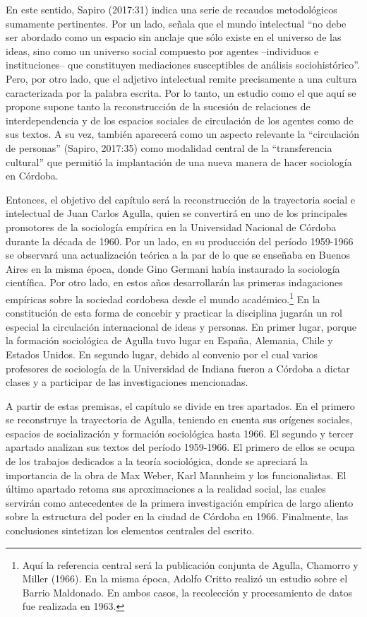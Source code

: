 En este sentido, Sapiro (2017:31) indica una serie de recaudos metodológicos sumamente pertinentes. Por un lado, señala que el mundo intelectual ``no debe ser abordado como un espacio sin anclaje que sólo existe en el universo de las ideas, sino como un universo social compuesto por agentes --individuos e instituciones-- que constituyen mediaciones susceptibles de análisis sociohistórico''. Pero, por otro lado, que el adjetivo intelectual remite precisamente a una cultura caracterizada por la palabra escrita. Por lo tanto, un estudio como el que aquí se propone supone tanto la reconstrucción de la sucesión de relaciones de interdependencia y de los espacios sociales de circulación de los agentes como de sus textos. A su vez, también aparecerá como un aspecto relevante la ``circulación de personas'' (Sapiro, 2017:35) como modalidad central de la ``transferencia cultural'' que permitió la implantación de una nueva manera de hacer sociología en Córdoba.

Entonces, el objetivo del capítulo será la reconstrucción de la trayectoria social e intelectual de Juan Carlos Agulla, quien se convertirá en uno de los principales promotores de la sociología empírica en la Universidad Nacional de Córdoba durante la década de 1960. Por un lado, en su producción del período 1959-1966 se observará una actualización teórica a la par de lo que se enseñaba en Buenos Aires en la misma época, donde Gino Germani había instaurado la sociología científica. Por otro lado, en estos años desarrollarán las primeras indagaciones empíricas sobre la sociedad cordobesa desde el mundo académico.\footnote{Aquí la referencia central será la publicación conjunta de Agulla, Chamorro y Miller (1966). En la misma época, Adolfo Critto realizó un estudio sobre el Barrio Maldonado. En ambos casos, la recolección y procesamiento de datos fue realizada en 1963.} En la constitución de esta forma de concebir y practicar la disciplina jugarán un rol especial la circulación internacional de ideas y personas. En primer lugar, porque la formación sociológica de Agulla tuvo lugar en España, Alemania, Chile y Estados Unidos. En segundo lugar, debido al convenio por el cual varios profesores de sociología de la Universidad de Indiana fueron a Córdoba a dictar clases y a participar de las investigaciones mencionadas.

A partir de estas premisas, el capítulo se divide en tres apartados. En el primero se reconstruye la trayectoria de Agulla, teniendo en cuenta sus orígenes sociales, espacios de socialización y formación sociológica hasta 1966. El segundo y tercer apartado analizan sus textos del período 1959-1966. El primero de ellos se ocupa de los trabajos dedicados a la teoría sociológica, donde se apreciará la importancia de la obra de Max Weber, Karl Mannheim y los funcionalistas. El último apartado retoma sus aproximaciones a la realidad social, las cuales servirán como antecedentes de la primera investigación empírica de largo aliento sobre la estructura del poder en la ciudad de Córdoba en 1966. Finalmente, las conclusiones sintetizan los elementos centrales del escrito.

